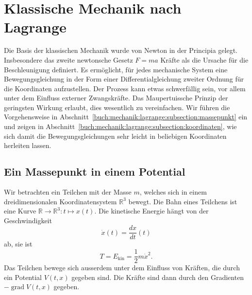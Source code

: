 %
%
%
\section{Klassische Mechanik nach Lagrange
\label{buch:mechanik:section:lagrange}}
Die Basis der klassischen Mechanik wurde von Newton in der
Principia \cite{buch:newton} gelegt.
%
Insbesondere das zweite newtonsche Gesetz
\(
F=ma
\)
Kräfte als die Ursache für die Beschleunigung definiert.
Es ermöglicht, für jedes mechanische System eine Bewegungsgleichung
in der Form einer Differentialgleichung zweiter Ordnung für die
Koordinaten aufzustellen.
Der Prozess kann etwas schwerfällig sein, vor allem unter dem Einfluss
externer Zwangskräfte.
Das Maupertuissche Prinzip der geringsten Wirkung erlaubt, dies wesentlich
zu vereinfachen.
%
Wir führen die Vorgehensweise in
Abschnitt~\ref{buch:mechanik:lagrange:subsection:massepunkt}
ein und zeigen in
Abschnitt~\ref{buch:mechanik:lagrange:subsection:koordinaten},
wie sich damit die Bewegungsgleichungen sehr leicht in beliebigen
Koordinaten herleiten lassen.


%
%
\subsection{Ein Massepunkt in einem Potential
\label{buch:mechanik:lagrange:subsection:massepunkt}}
Wir betrachten ein Teilchen mit der Masse $m$, welches sich in
einem dreidimensionalen Koordinatensystem $\mathbb{R}^3$ bewegt.
Die Bahn eines Teilchens ist eine Kurve
$\mathbb{R}\to\mathbb{R}^3:t\mapsto x(t)$.
Die kinetische Energie hängt von der Geschwindigkeit 
%
%
\[
\dot{x}(t) = \frac{dx}{dt}(t)
\]
ab, sie ist
\[
T=
E_{\text{kin}}
=
\frac12 m\dot{x}^2.
\]
Das Teilchen bewege sich ausserdem unter dem Einfluss von Kräften,
die durch ein Potential $V(t,x)$ gegeben sind.
Die Kräfte sind dann durch den Gradienten $-\operatorname{grad}V(t,x)$ 
gegeben.

